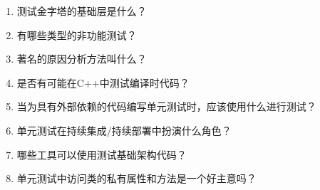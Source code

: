 \begin{enumerate}
\item
测试金字塔的基础层是什么？

\item
有哪些类型的非功能测试？

\item
著名的原因分析方法叫什么？

\item
是否有可能在C++中测试编译时代码？

\item
当为具有外部依赖的代码编写单元测试时，应该使用什么进行测试？

\item
单元测试在持续集成/持续部署中扮演什么角色？

\item
哪些工具可以使用测试基础架构代码？

\item
单元测试中访问类的私有属性和方法是一个好主意吗？
\end{enumerate}